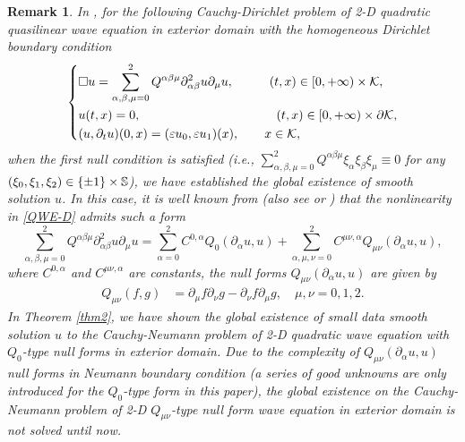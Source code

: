 \documentclass[11pt,twoside]{article}
\def\cK{\mathcal K}
\def\SS{\mathop{\mathbb S\kern 0pt}\nolimits}
\def\ds{\displaystyle}
\def\p{\partial}
\def\ve{\varepsilon}
\theoremstyle{plain}
\newtheorem{remark}{Remark}[section]
\theoremstyle{definition}
\numberwithin{equation}{section}
\begin{document}
\begin{remark}\label{YinA-2}
In \cite{HouYinYuan24}, for the following Cauchy-Dirichlet problem of 2-D
quadratic quasilinear wave equation in exterior domain with the homogeneous Dirichlet boundary condition
\begin{equation}\label{QWE-D}
\left\{
\begin{aligned}
&\Box u=\sum_{\alpha,\beta,\mu=0}^2Q^{\alpha\beta\mu}\p^2_{\alpha\beta}u\p_{\mu}u,\hspace{1cm} (t,x)\in[0,+\infty)\times\cK,\\
&u(t,x)=0,\hspace{3.8cm} (t,x)\in[0,+\infty)\times\p\cK,\\
&(u,\p_tu)(0,x)=(\ve u_0,\ve u_1)(x),\qquad x\in\cK,
\end{aligned}
\right.
\end{equation}
when the first null condition is satisfied (i.e., $\ds\sum_{\alpha,\beta,\mu=0}^2Q^{\alpha\beta\mu}\xi_{\alpha}\xi_{\beta}\xi_{\mu}\equiv0$
for any $(\xi_0,\xi_1,\xi_2)\in\{\pm1\}\times\SS$), we have established the global existence of smooth solution $u$.
In this case, it is well known from \cite{Klainerman} (also see \cite[Page 79]{MetcalfeSogge05} or \cite[Remark 1.1]{HouYinYuan24}) that
the nonlinearity in \eqref{QWE-D} admits such a form
\begin{equation}\label{QWE-D-NL}
\sum_{\alpha,\beta,\mu=0}^2Q^{\alpha\beta\mu}\p^2_{\alpha\beta}u\p_{\mu}u
=\sum_{\alpha=0}^2C^{0,\alpha}Q_0(\p_{\alpha}u,u)
+\sum_{\alpha,\mu,\nu=0}^2C^{\mu\nu,\alpha}Q_{\mu\nu}(\p_{\alpha}u,u),
\end{equation}
where $C^{0,\alpha}$ and $C^{\mu\nu,\alpha}$ are constants,  the null forms $Q_{\mu\nu}(\p_{\alpha}u,u)$ are given by
\begin{equation}\label{Intro:nullform}
\begin{split}
Q_{\mu\nu}(f,g)&=\p_{\mu}f\p_{\nu}g-\p_{\nu}f\p_{\mu}g,\quad \mu,\nu=0,1,2.
\end{split}
\end{equation}
In Theorem \ref{thm2}, we have shown the global existence of small data smooth solution $u$ to
the Cauchy-Neumann problem of 2-D quadratic wave equation with $Q_0$-type null forms in exterior domain.
Due to the complexity of $Q_{\mu\nu}(\p_{\alpha}u,u)$ null forms in Neumann boundary condition
(a series of good unknowns are only introduced for the $Q_0$-type form in this paper),
the global existence on the Cauchy-Neumann problem of 2-D $Q_{\mu\nu}$-type null form wave equation in exterior domain
is not solved until now.
\end{remark}
\end{document}
